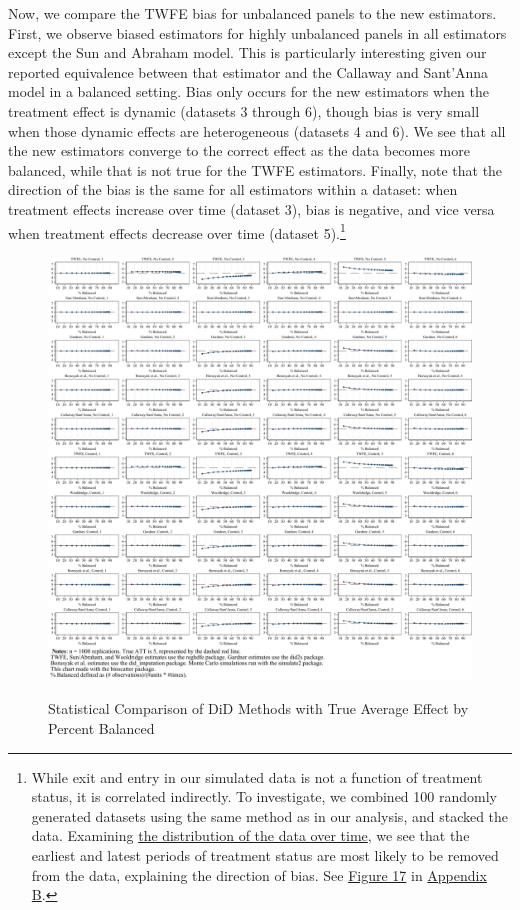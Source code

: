 \documentclass[12pt]{article}
\begin{document}
Now, we compare the TWFE bias for unbalanced panels to the new estimators. First, we observe biased estimators for highly unbalanced panels in all estimators except the Sun and Abraham model. This is particularly interesting given our reported equivalence between that estimator and the Callaway and Sant’Anna model in a balanced setting. Bias only occurs for the new estimators when the treatment effect is dynamic (datasets 3 through 6), though bias is very small when those dynamic effects are heterogeneous (datasets 4 and 6). We see that all the new estimators converge to the correct effect as the data becomes more balanced, while that is not true for the TWFE estimators. Finally, note that the direction of the bias is the same for all estimators within a dataset: when treatment effects increase over time (dataset 3), bias is negative, and vice versa when treatment effects decrease over time (dataset 5).\footnote{While exit and entry in our simulated data is not a function of treatment status, it is correlated indirectly. To investigate, we combined 100 randomly generated datasets using the same method as in our analysis, and stacked the data. Examining \hyperref[fig:dist-treat]{the distribution of the data over time}, we see that the earliest and latest periods of treatment status are most likely to be removed from the data, explaining the direction of bias. See \hyperref[fig:dist-treat]{Figure 17} in \hyperref[sec:appendixb]{Appendix B}.}
\begin{figure}[H]
    \centering
    \caption{Statistical Comparison of DiD Methods with True Average Effect by Percent Balanced}
    \includegraphics[width=6in]{Figures/Binscatters by Percent Balanced Common Scale.jpg}
    \label{fig:estimators-balanced}
\end{figure}
\end{document}
